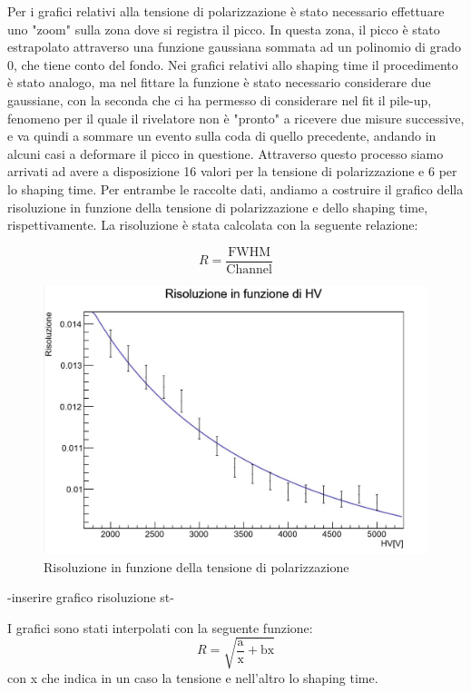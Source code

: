 \documentclass[a4paper,10pt]{article}
\begin{document}
Per i grafici relativi alla tensione di polarizzazione è stato necessario effettuare uno "zoom" sulla zona dove si registra il picco. In questa zona, il picco è stato estrapolato attraverso una funzione gaussiana sommata ad un polinomio di grado 0, che tiene conto del fondo. Nei grafici relativi allo shaping time il procedimento è stato analogo, ma nel fittare la funzione è stato necessario considerare due gaussiane, con la seconda che ci ha permesso di considerare nel fit il pile-up, fenomeno per il quale il rivelatore non è "pronto" a ricevere due misure successive, e va quindi a sommare un evento sulla coda di quello precedente, andando in alcuni casi a deformare il picco in questione. Attraverso questo processo siamo arrivati ad avere a disposizione 16 valori per la tensione di polarizzazione e 6 per lo shaping time. Per entrambe le raccolte dati, andiamo a costruire il grafico della risoluzione in funzione della tensione di polarizzazione e dello shaping time, rispettivamente. La risoluzione è stata calcolata con la seguente relazione: 

\begin{equation}
	R=\frac{\textrm{FWHM}}{\textrm{Channel}}
\end{equation}

\begin{figure}[h!]
    \centering
    \includegraphics[scale=0.45]{grafici/risoluzionehv}
    \caption{Risoluzione in funzione della tensione di polarizzazione}
\end{figure}

-inserire grafico risoluzione st-

I grafici sono stati interpolati con la seguente funzione: 
\begin{equation}
	R=\sqrt{\frac{\textrm{a}}{\textrm{x}}+\textrm{bx}}
\end{equation}
con x che indica in un caso la tensione e nell'altro lo shaping time.
\end{document}
